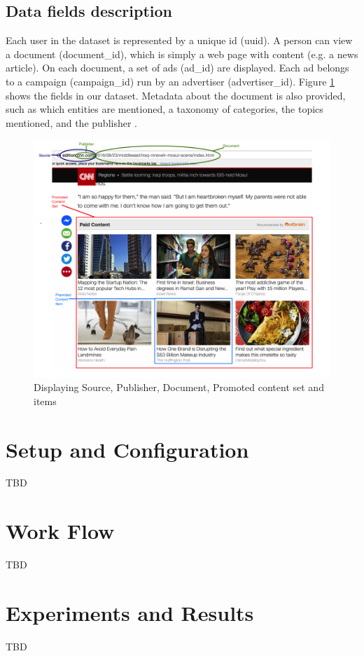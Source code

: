 \documentclass[9pt,twocolumn,twoside]{../../styles/osajnl}
\begin{document}
\subsection{Data fields description}
Each user in the dataset is represented by a unique id (uuid). A person can view a document (document\_id), which is simply a web page with content (e.g.  a news article). On each document, a set of ads (ad\_id) are displayed. Each ad belongs to a campaign (campaign\_id) run by an advertiser (advertiser\_id). Figure \ref{fig:OutbrainData} shows the fields in our dataset. Metadata about the document is also provided, such as which entities are mentioned, a taxonomy of categories, the topics mentioned, and the publisher \cite{kaggle-outbrain}.

\begin{figure}[htbp]
\centering
\includegraphics[width=\linewidth]{images/page_view.png}
\caption{Displaying Source, Publisher, Document, Promoted content set and items \cite{kaggle-outbrain}}
\label{fig:OutbrainData}
\end{figure}

\section{Setup and Configuration}
TBD

\section{Work Flow}
TBD

\section{Experiments and Results}
TBD
\end{document}

